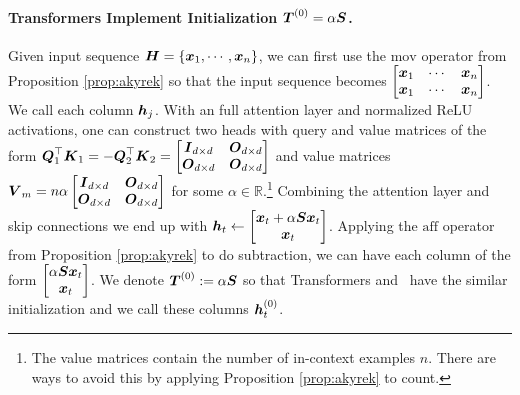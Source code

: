 \paragraph{Transformers Implement Initialization $\boldsymbol{T}^{(0)} = \alpha \boldsymbol{S}$.} Given input sequence $\boldsymbol{H} = \{\boldsymbol{x}_1, \cdots, \boldsymbol{x}_n \}$, we can first use the $\mathrm{mov}$ operator from Proposition \ref{prop:akyrek} %
so that the input sequence becomes $\begin{bmatrix}
    \boldsymbol{x}_1 & \cdots & \boldsymbol{x}_n \\
    \boldsymbol{x}_1 & \cdots & \boldsymbol{x}_n 
\end{bmatrix}$. We call each column $\boldsymbol{h}_j$. With an full attention layer and normalized ReLU activations, one can construct two heads with query and value matrices of the form $\boldsymbol{Q}_1^\top \boldsymbol{K}_1 = -\boldsymbol{Q}_2^\top \boldsymbol{K}_2 = \begin{bmatrix}
    \boldsymbol{I}_{d \times d} & \boldsymbol{O}_{d \times d} \\
    \boldsymbol{O}_{d \times d} & \boldsymbol{O}_{d \times d}
\end{bmatrix}$ and value matrices $\boldsymbol{V}_m =n \alpha \begin{bmatrix}
    \boldsymbol{I}_{d \times d} & \boldsymbol{O}_{d \times d} \\
    \boldsymbol{O}_{d \times d} & \boldsymbol{O}_{d \times d}
\end{bmatrix}$  for some $\alpha \in \mathbb R$.\footnote{The value matrices contain the number of in-context examples $n$. There are ways to avoid this by applying Proposition \ref{prop:akyrek} to count.} Combining the attention layer and skip connections we end up with $\boldsymbol{h}_t \leftarrow \begin{bmatrix}
        \boldsymbol{x}_t + \alpha \boldsymbol{S} \boldsymbol{x}_t \\ \boldsymbol{x}_t
\end{bmatrix} $. Applying the $\mathrm{aff}$ operator from Proposition \ref{prop:akyrek} to do subtraction, we can have each column of the form $\begin{bmatrix}
        \alpha \boldsymbol{S} \boldsymbol{x}_t \\ \boldsymbol{x}_t
\end{bmatrix}$. We denote $\boldsymbol{T}^{(0)} :=  \alpha \boldsymbol{S}$ so that Transformers and \newton\ have the similar initialization and we call these columns $\boldsymbol{h}_t^{(0)}$.  

